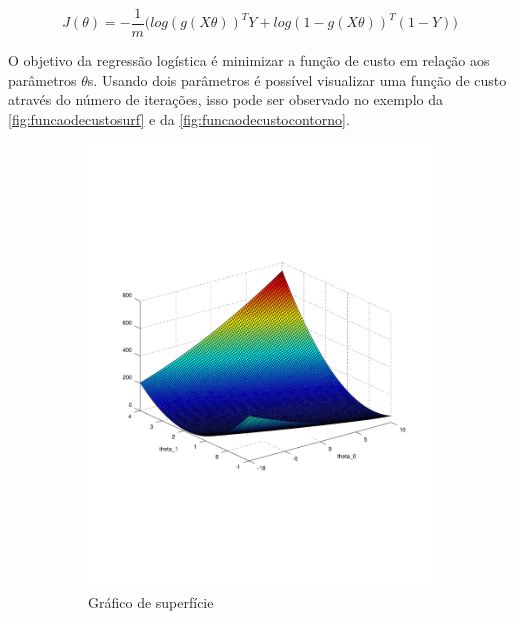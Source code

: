\begin{equation}
J(\theta) = - \frac{1}{m}\Big( log(g(X\theta))^TY + log(1 - g(X\theta))^T(1 - Y) \Big) \label{eq:funcaodecustovet}
\end{equation}

O objetivo da regressão logística é minimizar a função de custo em relação aos parâmetros $\theta$s. Usando dois parâmetros é possível visualizar uma função de custo através do número de iterações, isso pode ser observado no exemplo da \autoref{fig:funcaodecustosurf} e da \autoref{fig:funcaodecustocontorno}. 


\begin{figure}
  \caption{Função de custo - $J(\theta_0, \theta_1)$}
  \begin{subfigure}[htb]{0.5\textwidth} 
    \includegraphics[width=\textwidth]{img/funcaodecustosurf} 
    \caption{Gráfico de superfície} \label{fig:funcaodecustosurf}
  \end{subfigure} 
  \begin{subfigure}[htb]{0.5\textwidth}

\end{subfigure}
\end{figure}
